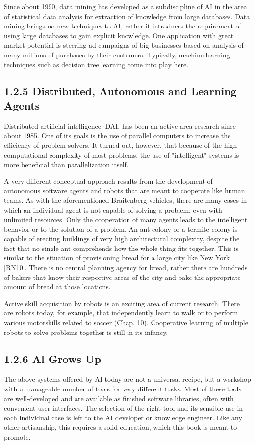 \documentclass[10pt]{article}
\begin{document}
Since about 1990, data mining has developed as a subdiscipline of AI in the area of statistical data analysis for extraction of knowledge from large databases. Data mining brings no new techniques to AI, rather it introduces the requirement of using large databases to gain explicit knowledge. One application with great market potential is steering ad campaigns of big businesses based on analysis of many millions of purchases by their customers. Typically, machine learning techniques such as decision tree learning come into play here.

\subsection*{1.2.5 Distributed, Autonomous and Learning Agents}
Distributed artificial intelligence, DAI, has been an active area research since about 1985. One of its goals is the use of parallel computers to increase the efficiency of problem solvers. It turned out, however, that because of the high computational complexity of most problems, the use of "intelligent" systems is more beneficial than parallelization itself.

A very different conceptual approach results from the development of autonomous software agents and robots that are meant to cooperate like human teams. As with the aforementioned Braitenberg vehicles, there are many cases in which an individual agent is not capable of solving a problem, even with unlimited resources. Only the cooperation of many agents leads to the intelligent behavior or to the solution of a problem. An ant colony or a termite colony is capable of erecting buildings of very high architectural complexity, despite the fact that no single ant comprehends how the whole thing fits together. This is similar to the situation of provisioning bread for a large city like New York [RN10]. There is no central planning agency for bread, rather there are hundreds of bakers that know their respective areas of the city and bake the appropriate amount of bread at those locations.

Active skill acquisition by robots is an exciting area of current research. There are robots today, for example, that independently learn to walk or to perform\\
various motorskills related to soccer (Chap. 10). Cooperative learning of multiple robots to solve problems together is still in its infancy.


\subsection*{1.2.6 Al Grows Up}
The above systems offered by AI today are not a universal recipe, but a workshop with a manageable number of tools for very different tasks. Most of these tools are well-developed and are available as finished software libraries, often with convenient user interfaces. The selection of the right tool and its sensible use in each individual case is left to the AI developer or knowledge engineer. Like any other artisanship, this requires a solid education, which this book is meant to promote.
\end{document}

